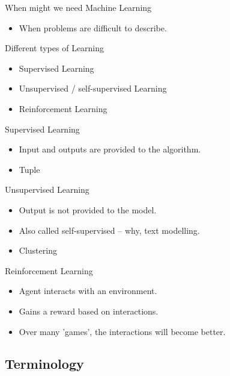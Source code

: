 \documentclass[10pt]{beamer}
\begin{document}
\begin{frame}[label={sec:org2a18575}]{When might we need Machine Learning}
\begin{itemize}
\item When problems are difficult to describe.
\end{itemize}
\end{frame}

\begin{frame}[label={sec:orgb8912cb}]{Different types of Learning}
\begin{itemize}
\item Supervised Learning
\item Unsupervised / self-supervised Learning
\item Reinforcement Learning
\end{itemize}
\end{frame}

\begin{frame}[label={sec:org432f690}]{Supervised Learning}
\begin{itemize}
\item Input and outputs are provided to the algorithm.
\item Tuple
\end{itemize}
\end{frame}

\begin{frame}[label={sec:org8c21865}]{Unsupervised Learning}
\begin{itemize}
\item Output is not provided to the model.
\item Also called self-supervised -- why, text modelling.
\item Clustering
\end{itemize}
\end{frame}

\begin{frame}[label={sec:org9f23bdc}]{Reinforcement Learning}
\begin{itemize}
\item Agent interacts with an environment.
\item Gains a reward based on interactions.
\item Over many 'games', the interactions will become better.
\end{itemize}
\end{frame}

\subsection*{Terminology}
\label{sec:orgf2a2b86}
\end{document}
